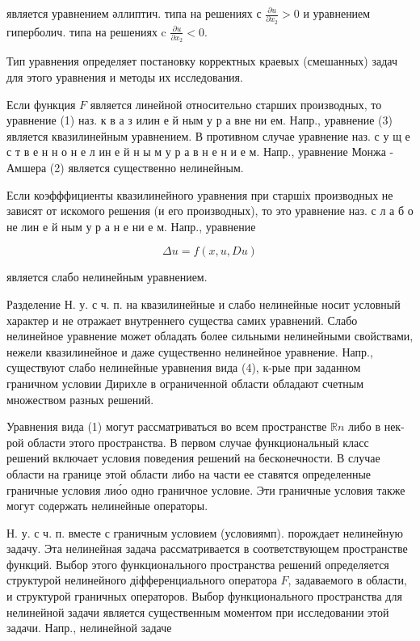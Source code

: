 \documentclass[10pt]{article}
\begin{document}
является уравнением әллиптич. типа на решениях с $\frac{\partial u}{\partial x_{2}}>0$ и уравнением гиперболич. типа на решениях c $\frac{\partial u}{\partial x_{2}}<0$.



Тип уравнения определяет постановку корректных краевых (смешанных) задач для этого уравнения и методы их исследования.



Если функция $F$ является линейной относительно старших производных, то уравнение (1) наз. к в а з илин е й ным у р а вне ни ем. Напр., уравнение (3) является квазилинейным уравнением. В противном случае уравнение наз. с у щ е с т в е н н о н е л ин е й н ы м у р а в н е н и е м. Напр., уравнение Монжа - Амшера (2) является существенно нелинейным.



Если коэфффициенты квазилинейного уравнения при старшіх производных не зависят от искомого решения (и его производных), то это уравнение наз. с л а б о не лин е й ным у р а н е ни е м. Напр., уравнение



\[

\Delta u=f(x, u, D u)

\]



является слабо нелинейным уравнением.



Разделение Н. у. с ч. п. на квазилинейные и слабо нелинейные носит условный характер и не отражает внутреннего существа самих уравнений. Слабо нелинейное уравнение может обладать более сильными нелинейными свойствами, нежели квазилинейное и даже существенно нелинейное уравнение. Напр., существуют слабо нелинейные уравнения вида (4), к-рые при заданном граничном условии Дирихле в ограниченной области обладают счетным множеством разных решений.



Уравнения вида (1) могут рассматриваться во всем пространстве $\mathbb{R} n$ либо в нек-рой области этого пространства. В первом случае функциональный класс решений включает условия поведения решений на бесконечности. В случае области на границе этой области либо на части ее ставятся определенные граничные условия лио́о одно граничное условие. Эти граничные условия также могут содержать нелинейные операторы.



Н. у. с ч. п. вместе с граничным условием (условиямп). порождает нелинейную задачу. Эта нелинейная задача рассматривается в соответствующем пространстве функций. Выбор этого функционального пространства решений определяется структурой нелинейного діфференциального оператора $F$, задаваемого в области, и структурой граничных операторов. Выбор функционального пространства для нелинейной задачи является существенным моментом при исследовании этой задачи. Напр., нелинейной задаче
\end{document}
